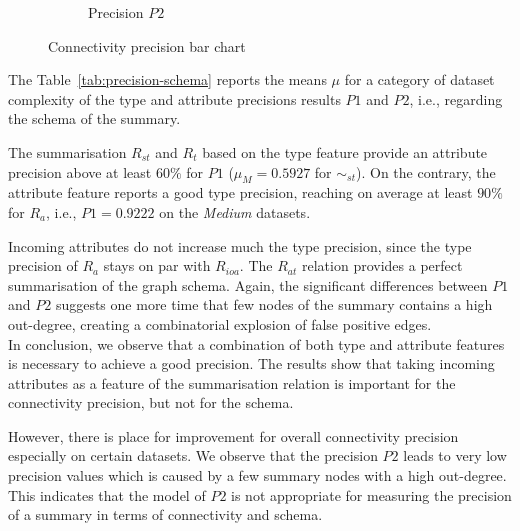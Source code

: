 \begin{figure}
\begin{subfigure}{.8\textwidth}
{
		}
		\caption{Precision $P2$}
	\end{subfigure}
	\caption{Connectivity precision bar chart}
	\label{fig:link-precision-bar}
\end{figure}


The Table~\ref{tab:precision-schema} reports the means $\mu$ for a category of dataset complexity of the type and attribute precisions results $P1$ and $P2$, i.e., regarding the schema of the summary.

The summarisation $R_{st}$ and $R_t$ based on the type feature provide an attribute precision above at least $60\%$ for $P1$ ($\mu_M=0.5927$ for $\sim_{st}$).
On the contrary, the attribute feature reports a good type precision, reaching on average at least $90\%$ for $R_a$, i.e., $P1=0.9222$ on the \emph{Medium} datasets.

Incoming attributes do not increase much the type precision, since the type precision of $R_a$ stays on par with $R_{ioa}$. The $R_{at}$ relation provides a perfect summarisation of the graph schema. Again, the significant differences between $P1$ and $P2$ suggests one more time that few nodes of the summary contains a high out-degree, creating a combinatorial explosion of false positive edges.\\

In conclusion, we observe that a combination of both type and attribute features is necessary to achieve a good precision. The results show that taking incoming attributes as a feature of the summarisation relation is important for the connectivity precision, but not for the schema.

However, there is place for improvement for overall connectivity precision especially on certain datasets. We observe that the precision $P2$ leads to very low precision values which is caused by a few summary nodes with a high out-degree. This indicates that the model of $P2$ is not appropriate for measuring the precision of a summary in terms of connectivity and schema.

